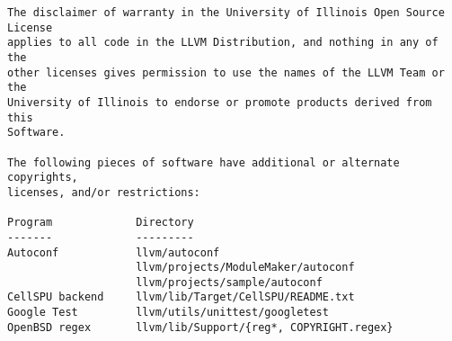 {\begin{verbatim}
The disclaimer of warranty in the University of Illinois Open Source License
applies to all code in the LLVM Distribution, and nothing in any of the
other licenses gives permission to use the names of the LLVM Team or the
University of Illinois to endorse or promote products derived from this
Software.

The following pieces of software have additional or alternate copyrights,
licenses, and/or restrictions:

Program             Directory
-------             ---------
Autoconf            llvm/autoconf
                    llvm/projects/ModuleMaker/autoconf
                    llvm/projects/sample/autoconf
CellSPU backend     llvm/lib/Target/CellSPU/README.txt
Google Test         llvm/utils/unittest/googletest
OpenBSD regex       llvm/lib/Support/{reg*, COPYRIGHT.regex}
\end{verbatim}
}

